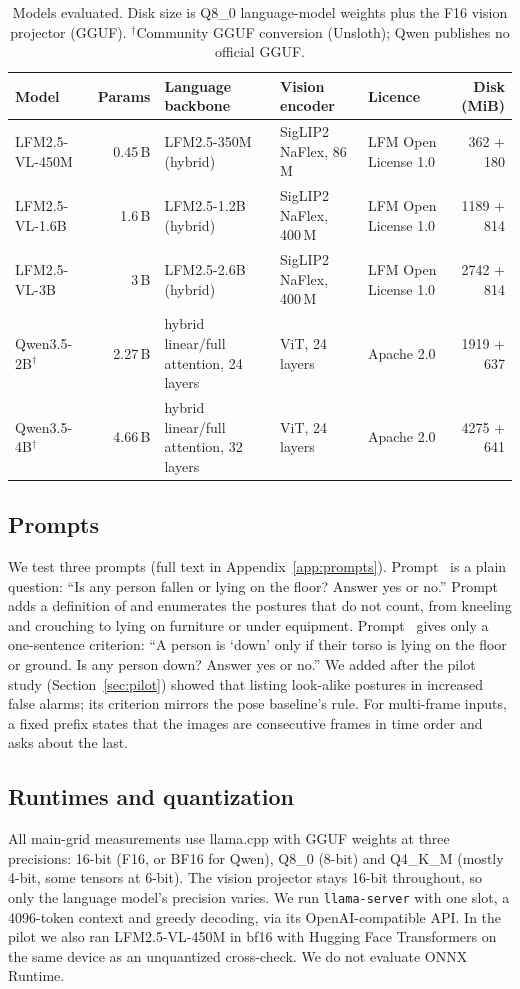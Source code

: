 \begin{table}[t]
\centering
\caption{Models evaluated. Disk size is Q8\_0 language-model weights plus the F16 vision projector (GGUF). $^\dagger$Community GGUF conversion (Unsloth); Qwen publishes no official GGUF.}
\label{tab:models}
\footnotesize
\begin{tabular}{lrlllr}
\toprule
Model & Params & Language backbone & Vision encoder & Licence & Disk (MiB) \\
\midrule
LFM2.5-VL-450M & 0.45\,B & LFM2.5-350M (hybrid) & SigLIP2 NaFlex, 86\,M & LFM Open License 1.0 & 362 + 180 \\
LFM2.5-VL-1.6B & 1.6\,B & LFM2.5-1.2B (hybrid) & SigLIP2 NaFlex, 400\,M & LFM Open License 1.0 & 1189 + 814 \\
LFM2.5-VL-3B & 3\,B & LFM2.5-2.6B (hybrid) & SigLIP2 NaFlex, 400\,M & LFM Open License 1.0 & 2742 + 814 \\
Qwen3.5-2B$^\dagger$ & 2.27\,B & hybrid linear/full attention, 24 layers & ViT, 24 layers & Apache 2.0 & 1919 + 637 \\
Qwen3.5-4B$^\dagger$ & 4.66\,B & hybrid linear/full attention, 32 layers & ViT, 24 layers & Apache 2.0 & 4275 + 641 \\
\bottomrule
\end{tabular}
\end{table}

\subsection{Prompts}
We test three prompts (full text in Appendix~\ref{app:prompts}). Prompt~\promptA{} is a plain question: ``Is any person fallen or lying on the floor? Answer yes or no.'' Prompt~\promptB{} adds a definition of \pd{} and enumerates the postures that do not count, from kneeling and crouching to lying on furniture or under equipment. Prompt~\promptBtwo{} gives only a one-sentence criterion: ``A person is `down' only if their torso is lying on the floor or ground. Is any person down? Answer yes or no.'' We added \promptBtwo{} after the pilot study (Section~\ref{sec:pilot}) showed that listing look-alike postures in \promptB{} increased false alarms; its criterion mirrors the pose baseline's rule. For multi-frame inputs, a fixed prefix states that the images are consecutive frames in time order and asks about the last.

\subsection{Runtimes and quantization}
All main-grid measurements use llama.cpp \cite{gerganov2023llamacpp} with GGUF weights at three precisions: 16-bit (F16, or BF16 for Qwen), Q8\_0 (8-bit) and Q4\_K\_M (mostly 4-bit, some tensors at 6-bit). The vision projector stays 16-bit throughout, so only the language model's precision varies. We run \texttt{llama-server} with one slot, a 4096-token context and greedy decoding, via its OpenAI-compatible API. In the pilot we also ran LFM2.5-VL-450M in bf16 with Hugging Face Transformers on the same device as an unquantized cross-check. We do not evaluate ONNX Runtime.

